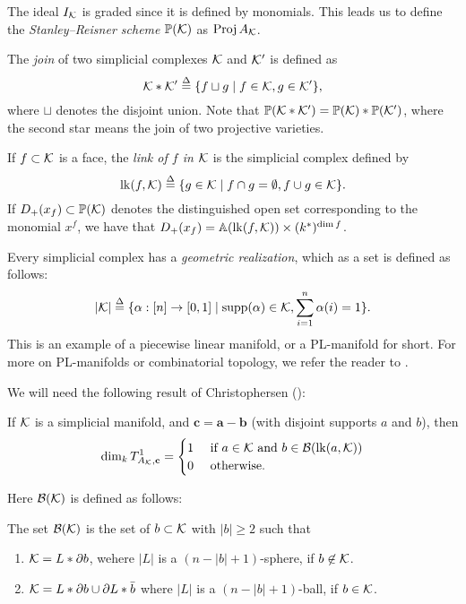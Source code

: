 The ideal $I_{\mathcal{K}}$ is graded since it is defined by monomials. This leads us to define the \emph{Stanley--Reisner scheme} $\mathbb{P}(\mathcal{K})$ as $\operatorname{Proj} A_{\mathcal{K}}$. 

The \emph{join} of two simplicial complexes $\mathcal{K}$ and $\mathcal{K}'$ is defined as
$$
\mathcal{K} \ast \mathcal{K}' \stackrel{\Delta}{=} \{ f \sqcup g \mid f \in \mathcal{K}, g \in \mathcal{K}' \},
$$
where $\sqcup$ denotes the disjoint union. Note that $\mathbb{P}(\mathcal{K} \ast \mathcal{K}') = \mathbb{P}(\mathcal{K}) \ast \mathbb{P}(\mathcal{K}')$, where the second star means the join of two projective varieties.

If $f \subset \mathcal{K}$ is a face, the \emph{link of $f$ in $\mathcal{K}$} is the simplicial complex defined by
$$
\mathrm{lk}(f,\mathcal{K}) \stackrel{\Delta}{=} \{ g \in \mathcal{K} \mid f \cap g = \emptyset, f \cup g \in \mathcal{K} \}.
$$
If $D_+(x_f) \subset \mathbb{P}(\mathcal{K})$ denotes the distinguished open set corresponding to the monomial $x^f$, we have that $D_+(x_f) = \mathbb{A}(\mathrm{lk}(f,\mathcal{K})) \times (k^\ast)^{\dim f}$. 

Every simplicial complex has a \emph{geometric realization}, which as a set is defined as follows:
$$
|\mathcal{K}| \stackrel{\Delta}{=}  \{ \alpha: [n] \to [0,1] \mid \operatorname{{supp}}(\alpha) \in \mathcal{K}, \sum_{i=1}^n \alpha(i) = 1 \}.
$$
This is an example of a piecewise linear manifold, or a PL-manifold for short. For more on PL-manifolds or combinatorial topology, we refer the reader to \cite{glaser_combtop,spanier_topology,hudson_pl}.

We will need the following result of Christophersen (\cite[Theorem 4.6]{deforming_christophersen}):

\begin{theorem}
\label{thm:t1dims}
If $\mathcal{K}$ is a simplicial manifold, and $\mathbf c = \mathbf a - \mathbf b$ (with disjoint supports $a$ and $b$), then
$$
\dim_k T_{A_{\mathcal{K}},\mathbf c}^1 = \begin{cases}
1 & \text{ if } a  \in \mathcal{K} \text{ and } b \in \mathcal B(\mathrm{lk}(a,\mathcal{K})) \\
0 & \text{ otherwise.}
\end{cases}
$$
\end{theorem}
Here $\mathcal B(\mathcal{K})$ is defined as follows:
\begin{definition}
The set $\mathcal B(\mathcal{K})$ is the set of $b \subset \mathcal{K}$ with $|b| \geq 2$ such that
\begin{enumerate}
	\item $\mathcal{K} = L \ast \partial b$, wehere $|L|$ is a $(n-|b|+1)$-sphere, if $b \not \in \mathcal{K}$.
	\item $\mathcal{K} = L \ast \partial b \cup \partial L \ast \bar{b}$ where $|L|$ is a $(n-|b|+1)$-ball, if $b \in \mathcal{K}$.
\end{enumerate}
\end{definition}

